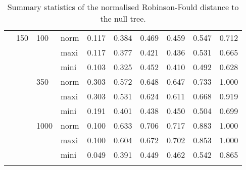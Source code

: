 \begin{longtable}{llllrrrrrr}
   & 150 & 100 & norm & 0.117 & 0.384 & 0.469 & 0.459 & 0.547 & 0.712 \\ 
   &  &  & maxi & 0.117 & 0.377 & 0.421 & 0.436 & 0.531 & 0.665 \\ 
   &  &  & mini & 0.103 & 0.325 & 0.452 & 0.410 & 0.492 & 0.628 \\ 
   &  & 350 & norm & 0.303 & 0.572 & 0.648 & 0.647 & 0.733 & 1.000 \\ 
   &  &  & maxi & 0.303 & 0.531 & 0.624 & 0.611 & 0.668 & 0.919 \\ 
   &  &  & mini & 0.191 & 0.401 & 0.438 & 0.450 & 0.504 & 0.699 \\ 
   &  & 1000 & norm & 0.100 & 0.633 & 0.706 & 0.717 & 0.883 & 1.000 \\ 
   &  &  & maxi & 0.100 & 0.604 & 0.672 & 0.702 & 0.853 & 1.000 \\ 
   &  &  & mini & 0.049 & 0.391 & 0.449 & 0.462 & 0.542 & 0.865 \\ 
   \hline
\hline
\caption{Summary statistics of the normalised Robinson-Fould distance to the null tree.} 
\label{Full_Tab_SummaryRFnull}
\end{longtable}
